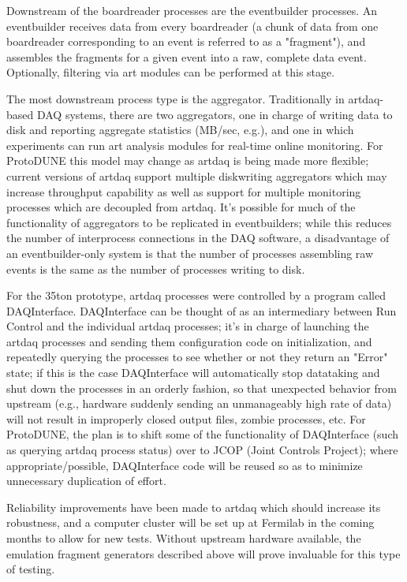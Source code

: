 Downstream of the boardreader processes are the eventbuilder
processes. An eventbuilder receives data from every boardreader (a
chunk of data from one boardreader corresponding to an event is
referred to as a "fragment"), and assembles the fragments for a given
event into a raw, complete data event. Optionally, filtering via art
modules can be performed at this stage.

The most downstream process type is the aggregator. Traditionally in
artdaq-based DAQ systems, there are two aggregators, one in charge of
writing data to disk and reporting aggregate statistics (MB/sec,
e.g.), and one in which experiments can run art analysis modules for
real-time online monitoring. For ProtoDUNE this model may change as
artdaq is being made more flexible; current versions of artdaq support
multiple diskwriting aggregators which may increase throughput
capability as well as support for multiple monitoring processes which
are decoupled from artdaq. It's possible for much of the functionality
of aggregators to be replicated in eventbuilders; while this reduces
the number of interprocess connections in the DAQ software, a
disadvantage of an eventbuilder-only system is that the number of
processes assembling raw events is the same as the number of processes
writing to disk.

For the 35ton prototype, artdaq processes were controlled by a program called
DAQInterface. DAQInterface can be thought of as an intermediary
between Run Control and the individual artdaq processes; it's in
charge of launching the artdaq processes and sending them
configuration code on initialization, and repeatedly querying the
processes to see whether or not they return an "Error" state; if this
is the case DAQInterface will automatically stop datataking and shut
down the processes in an orderly fashion, so that unexpected behavior
from upstream (e.g., hardware suddenly sending an unmanageably high
rate of data) will not result in improperly closed output files,
zombie processes, etc. For ProtoDUNE, the plan is to shift some of the functionality of DAQInterface (such as querying artdaq process status) over to JCOP (Joint Controls Project);
 where appropriate/possible, DAQInterface code will be reused so as to minimize unnecessary duplication of effort. 

Reliability improvements have been made to
artdaq which should increase its robustness, and a computer cluster will be set up at Fermilab in the
coming months to allow for new tests. Without upstream hardware
available, the emulation fragment generators described above will
prove invaluable for this type of testing.




